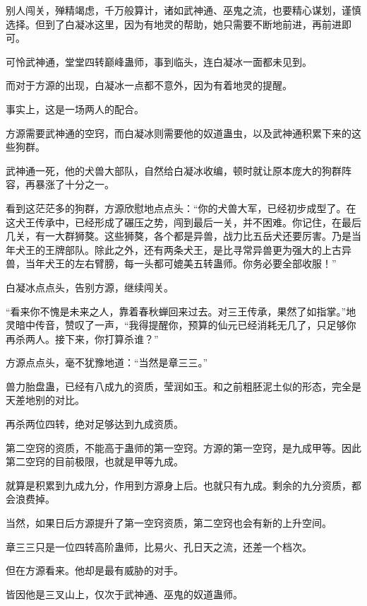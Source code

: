 
\begin{this_body}



别人闯关，殚精竭虑，千万般算计，诸如武神通、巫鬼之流，也要精心谋划，谨慎选择。但到了白凝冰这里，因为有地灵的帮助，她只需要不断地前进，再前进即可。

可怜武神通，堂堂四转巅峰蛊师，事到临头，连白凝冰一面都未见到。

而对于方源的出现，白凝冰一点都不意外，因为有着地灵的提醒。

事实上，这是一场两人的配合。

方源需要武神通的空窍，而白凝冰则需要他的奴道蛊虫，以及武神通积累下来的这些狗群。

武神通一死，他的犬兽大部队，自然给白凝冰收编，顿时就让原本庞大的狗群阵容，再暴涨了十分之一。

看到这茫茫多的狗群，方源欣慰地点点头：“你的犬兽大军，已经初步成型了。在这犬王传承中，已经形成了碾压之势，闯到最后一关，并不困难。你记住，在最后几关，有一大群狮獒。这些狮獒，各个都是异兽，战力比五岳犬还要厉害。乃是当年犬王的王牌部队。除此之外，还有两条犬王，是比寻常异兽更为强大的上古异兽，当年犬王的左右臂膀，每一头都可媲美五转蛊师。你务必要全部收服！”

白凝冰点点头，告别方源，继续闯关。

“看来你不愧是未来之人，靠着春秋蝉回来过去。对三王传承，果然了如指掌。”地灵暗中传音，赞叹了一声，“我得提醒你，预算的仙元已经消耗无几了，只足够你再杀两人。接下来，你打算杀谁？”

方源点点头，毫不犹豫地道：“当然是章三三。”

兽力胎盘蛊，已经有八成九的资质，莹润如玉。和之前粗胚泥土似的形态，完全是天差地别的对比。

再杀两位四转，绝对足够达到九成资质。

第二空窍的资质，不能高于蛊师的第一空窍。方源的第一空窍，是九成甲等。因此第二空窍的目前极限，也就是甲等九成。

就算是积累到九成九分，作用到方源身上后。也就只有九成。剩余的九分资质，都会浪费掉。

当然，如果日后方源提升了第一空窍资质，第二空窍也会有新的上升空间。

章三三只是一位四转高阶蛊师，比易火、孔日天之流，还差一个档次。

但在方源看来。他却是最有威胁的对手。

皆因他是三叉山上，仅次于武神通、巫鬼的奴道蛊师。


\end{this_body}
